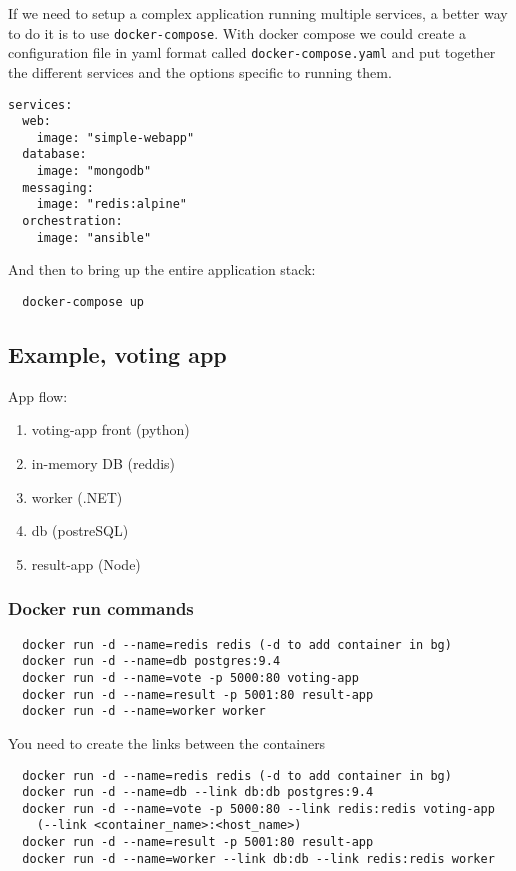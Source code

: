 \documentclass[french]{article}
\begin{document}
If we need to setup a complex application running multiple services, a better way to do it is to use \verb|docker-compose|. With docker compose we could create a configuration file in yaml format called \verb|docker-compose.yaml| and put together the different services and the options specific to running them.
\begin{verbatim}
services:
  web:
    image: "simple-webapp"
  database:
    image: "mongodb"
  messaging:
    image: "redis:alpine"
  orchestration:
    image: "ansible"
\end{verbatim}

And then to bring up the entire application stack:
\begin{verbatim}
  docker-compose up
\end{verbatim}

\subsection{Example, voting app}

App flow:
\begin{enumerate}
  \item voting-app front (python)
  \item in-memory DB (reddis)
  \item worker (.NET)
  \item db (postreSQL)
  \item result-app (Node)
\end{enumerate}

\subsubsection{Docker run commands}
\begin{verbatim}
  docker run -d --name=redis redis (-d to add container in bg)
  docker run -d --name=db postgres:9.4
  docker run -d --name=vote -p 5000:80 voting-app
  docker run -d --name=result -p 5001:80 result-app
  docker run -d --name=worker worker
\end{verbatim}

You need to create the links between the containers
\begin{verbatim}
  docker run -d --name=redis redis (-d to add container in bg)
  docker run -d --name=db --link db:db postgres:9.4
  docker run -d --name=vote -p 5000:80 --link redis:redis voting-app
    (--link <container_name>:<host_name>)
  docker run -d --name=result -p 5001:80 result-app
  docker run -d --name=worker --link db:db --link redis:redis worker
\end{verbatim}
\end{document}
